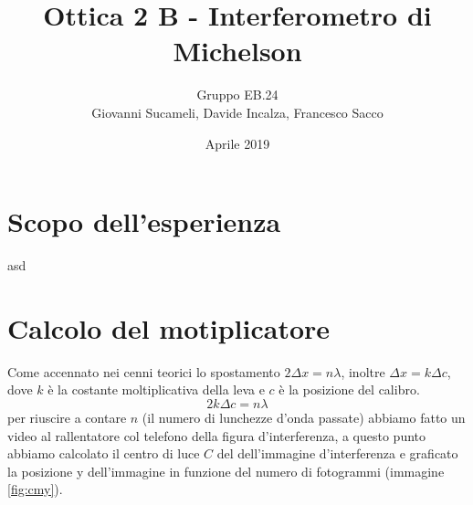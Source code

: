 \documentclass[10pt,a4paper]{article}
\author{Gruppo EB.24 \\Giovanni Sucameli, Davide Incalza, Francesco Sacco}
\title{Ottica 2 B - Interferometro di Michelson}
\date{Aprile 2019}
\begin{document}
\maketitle
\section*{Scopo dell'esperienza}
	asd
\section*{Calcolo del motiplicatore}
	Come accennato nei cenni teorici lo spostamento $2\Delta x=n\lambda$, inoltre $\Delta x= k\Delta c$, dove $k$ è la costante moltiplicativa della leva e $c$ è la posizione del calibro.\newline
	\begin{equation}
		2k\Delta c=n\lambda
	\end{equation}
	per riuscire a contare $n$ (il numero di lunchezze d'onda passate) abbiamo fatto un video al rallentatore col telefono della figura d'interferenza, a questo punto abbiamo calcolato il centro di luce $C$ del dell'immagine d'interferenza e graficato la posizione y dell'immagine in funzione del numero di fotogrammi (immagine \ref{fig:cmy}).
\end{document}
